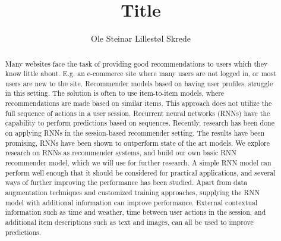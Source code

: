 \documentclass[a4paper, twoside, titlepage, 12pt]{report}
\title{Title}
\author{Ole Steinar Lillestøl Skrede}
\begin{document}
	


\begin{abstract}
	Many websites face the task of providing good recommendations to users which they know little about. E.g. an e-commerce site where many users are not logged in, or most users are new to the site. Recommender models based on having user profiles, struggle in this setting. The solution is often to use item-to-item models, where recommendations are made based on similar items. This approach does not utilize the full sequence of actions in a user session. Recurrent neural networks (RNNs) have the capability to perform predictions based on sequences. Recently, research has been done on applying RNNs in the session-based recommender setting. The results have been promising, RNNs have been shown to outperform state of the art models. We explore research on RNNs as recommender systems, and build our own basic RNN recommender model, which we will use for further research. A simple RNN model can perform well enough that it should be considered for practical applications, and several ways of further improving the performance has been studied. Apart from data augmentation techniques and customized training approaches, supplying the RNN model with additional information can improve performance. External contextual information such as time and weather, time between user actions in the session, and additional item descriptions such as text and images, can all be used to improve predictions.
\end{abstract}
\tableofcontents \clearpage

\setcounter{page}{0}






\appendix

%


{}
\end{document}
